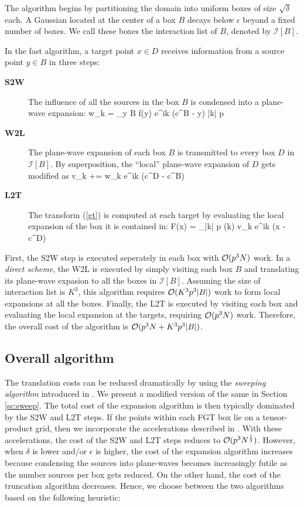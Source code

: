 The algorithm begins by partitioning the domain into uniform boxes of size $\sqrt{\delta}$ each. A Gaussian located at the center of a box $B$ decays below $\epsilon$ beyond a fixed number of boxes. We call these boxes the interaction list of $B$, denoted by $\mathcal{I}[B]$. 

In the fast algorithm, a target point $x \in D$ receives information from a source point $y \in B$ in three steps:
\begin{description}
\item[\textbf{S2W}] The influence of all the sources in the box $B$ is condensed into a plane-wave expansion:
            \beq w_k = \sum_{y \in B} f(y) e^{i\lambda k \cdot (c^B - y)} \quad \forall\quad |k| \leq p  \label{eqn:s2w} \eeq
            
\item[\textbf{W2L}] The plane-wave expansion of each box $B$ is transmitted to every box $D$ in $\mathcal{I}[B]$. By
 superposition, the ``local'' plane-wave expansion of $D$ gets modified as
            \beq v_k += w_k e^{i\lambda k \cdot (c^D - c^B)} \label{e:w2l}\eeq
            
\item[\textbf{L2T}] The transform (\ref{gt}) is computed at each target by evaluating the local expansion of the 
box it is contained in:
            \beq F(x) = \sum_{|k| \leq p} (k) v_k e^{i\lambda k \cdot (x - c^D)} \label{eqn:l2t}\eeq
\end{description} 

First, the S2W step is executed seperately in each box with $\mathcal{O}(p^3 N)$ work. In a {\em direct scheme}, 
the W2L is executed by simply visiting each box $B$ and translating its plane-wave expasion to all the boxes
 in $\mathcal{I}[B]$. Assuming the size of interaction list is $K^3$, this algorithm requires $\mathcal{O}(K^3 p^3 |B|)$ work 
 to form local expansions at all the boxes. Finally, the L2T is executed by visiting each box and evaluating the 
 local expansion at the targets, requiring $\mathcal{O}(p^3 N)$ work. Therefore, the overall cost of the algorithm is $\mathcal{O}(p^3 N + K^3 p^3 |B|)$.  

\subsection{Overall algorithm} 
The translation costs can be reduced dramatically by using the {\em sweeping algorithm} introduced in \cite{greengard98}. We present a 
modified version of the same in Section \ref{sc:sweep}. The total cost of the expansion algorithm is then typically dominated by the S2W
 and L2T steps. If the points within each FGT box lie on a tensor-product grid, then we incorporate the accelerations described in \cite{fggt}. With these
 accelerations, the cost of the S2W and L2T steps reduces to $\mathcal{O}(p^3 N^{\frac{1}{3}})$.
 However, when $\delta$ is lower and/or $\epsilon$ is higher, the cost of the expansion algorithm increases because 
 condensing the sources into plane-waves becomes increasingly futile as the number sources per box gets reduced. On the other hand, the
 cost of the truncation algorithm decreases. Hence, we choose between the two algorithms based on the following heuristic:

